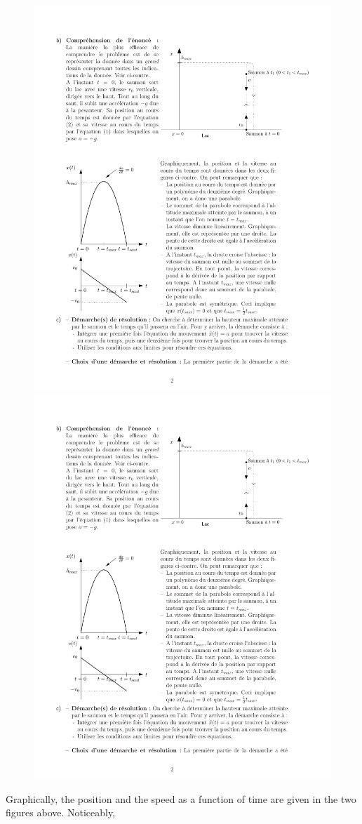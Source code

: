 \begin{enumerate}
\begin{center}
{}\\
\end{center}
\hspace*{15mm}
\begin{figure}
\begin{center}
\includegraphics[width=.45\textwidth]{figures/serie01_c_fig1-2b.pdf}
\vspace{.05\textwidth}
\includegraphics[width=.45\textwidth]{figures/serie01_c_fig1-2c.pdf}
\end{center}
\end{figure}
\vspace{0.9cm}


Graphically, the position and the speed as a function of time are given in the two figures above. Noticeably, 
\begin{itemize}


\end{itemize}
\end{enumerate}

